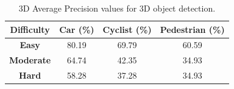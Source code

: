 \documentclass[10pt,twocolumn,letterpaper]{article}
\begin{document}

\begin{table}[!htbp]
    \centering
    \begin{tabular}{|c|c|c|c|}
        \hline \textbf{Difficulty} & \textbf{Car (\%)} & \textbf{Cyclist (\%)} & \textbf{Pedestrian (\%)}  \\
        \hline \textbf{Easy} & 80.19  & 69.79  & 60.59 \\
        \hline \textbf{Moderate} & 64.74  & 42.35 & 34.93 \\
        \hline \textbf{Hard} & 58.28  & 37.28  & 34.93  \\
        \hline
    \end{tabular}
	\caption[3D AP calculated for 2D proposals generated from 3D Annotations]{3D Average Precision values for 3D object detection.}
	\label{3DAP_Values-1}
    \end{table}
\end{document}
